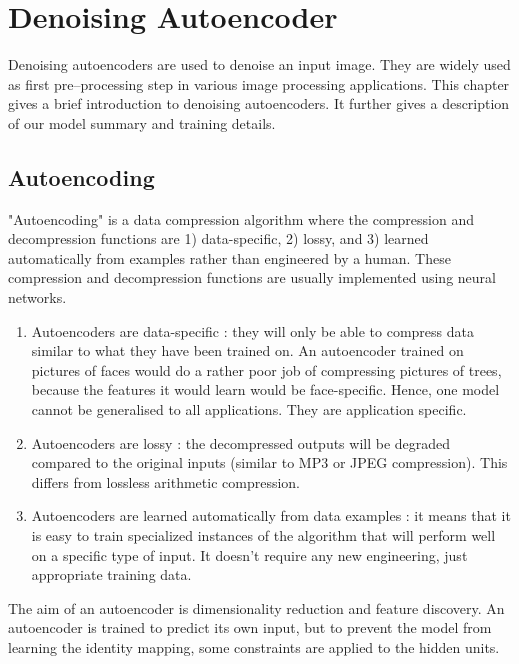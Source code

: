 \chapter{Denoising Autoencoder}

\indent\indent Denoising autoencoders are used to denoise an input image. They are widely used as first pre--processing step in various image processing applications. This chapter gives a brief introduction to denoising autoencoders. It further gives a description of our model summary and training details. 

\section{Autoencoding}
"Autoencoding" is a data compression algorithm where the compression and decompression functions are 1) data-specific, 2) lossy, and 3) learned automatically from examples rather than engineered by a human. These compression and decompression functions are usually implemented using neural networks.

\begin{enumerate}
\item Autoencoders are data-specific : they will only be able to compress data similar to what they have been trained on. An autoencoder trained on pictures of faces would do a rather poor job of compressing pictures of trees, because the features it would learn would be face-specific. Hence, one model cannot be generalised to all applications. They are application specific.
\item Autoencoders are lossy : the decompressed outputs will be degraded compared to the original inputs (similar to MP3 or JPEG compression). This differs from lossless arithmetic compression.
\item Autoencoders are learned automatically from data examples : it means that it is easy to train specialized instances of the algorithm that will perform well on a specific type of input. It doesn't require any new engineering, just appropriate training data.
\end{enumerate}
The aim of an autoencoder is dimensionality reduction and feature discovery. An autoencoder is trained to predict its own input,
but to prevent the model from learning the identity mapping,
some constraints are applied to the hidden units.\cite{yasenko2020image}
\vspace{0.75cm}

